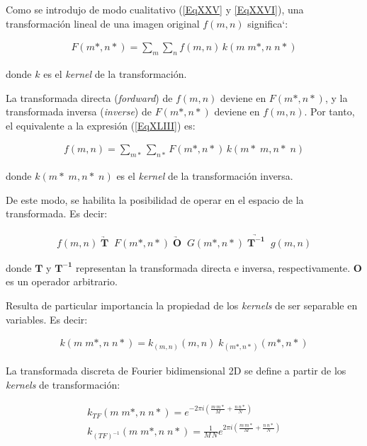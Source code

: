 Como se introdujo de modo cualitativo (\ref{EqXXV} y \ref{EqXXVI}), una transformaci\'on lineal de una imagen original $f(m, n)$ significa`:

\begin{eqnarray}
	F (m*, n*) = \sum _{m} \sum _{n} f(m, n) \, k(m \; m*, n \; n*)
\label{EqXLIII}
\end{eqnarray}

donde $k$ es el \textit{kernel} de la transformaci\'on.
%

%
La transformada directa (\textit{fordward}) de $f(m, n)$ deviene en $F(m*, n*)$, y la transformada inversa (\textit{inverse}) de $F(m*, n*)$ deviene en 
$f(m, n)$. Por tanto, el equivalente a la expresi\'on (\ref{EqXLIII}) es:
%

\begin{eqnarray}
	f (m, n) = \sum _{m*} \sum _{n*} F(m*, n*) \, k(m* \; m, n* \; n)
\label{EqXLIV}
\end{eqnarray}

donde $k(m* \; m, n* \; n)$ es el \textit{kernel} de la transformaci\'on inversa.
%

%
De este modo, se habilita la posibilidad de operar en el espacio de la transformada. Es decir:

\begin{eqnarray}
	f (m, n) \; \underrightarrow{\mathbf{T}} \; \; F(m*, n*) \; \underrightarrow{\mathbf{O}} \; \; G(m*, n*) \; 
	\underrightarrow{\mathbf{T^{-1}}} \; \; g(m, n)
\label{EqXLV}
\end{eqnarray}


donde $\mathbf{T}$ y $\mathbf{T^{-1}}$ representan la transformada directa e inversa, respectivamente. $\mathbf{O}$ es un operador arbitrario.
%

%
Resulta de particular importancia la propiedad de los \textit{kernels} de ser separable en variables. Es decir:

\begin{eqnarray}
	k (m \; m*, n \; n*) = k_{(m, n)} (m, n) \;  k_{(m*, n*)} (m*, n*)
\label{EqXLVI}
\end{eqnarray}


La transformada discreta de Fourier bidimensional 2D se define a partir de los \textit{kernels} de transformaci\'on:

\begin{eqnarray}
	k_{TF} (m \; m*, n \; n*) = e^{-2 \pi i \left( \frac{m \, m*}{M} + \frac{n \, n*}{N}\right)} \nonumber \\
	k_{(TF)^{-1}} (m \; m*, n \; n*) = \frac{1}{M \, N}e^{2 \pi i \left( \frac{m \, m*}{M} + \frac{n \, n*}{N}\right)}
\label{EqXLVII}
\end{eqnarray}

